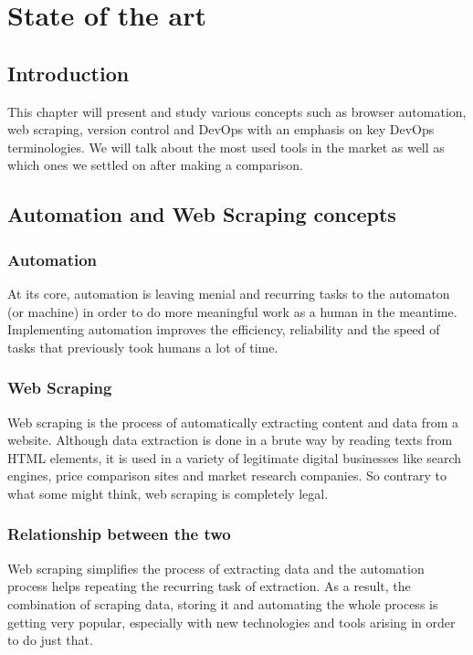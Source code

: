 \chapter{State of the art}
\minitoc
\newpage

\setcounter{secnumdepth}{0} %
\section{Introduction}
This chapter will present and study various concepts such as browser automation, web scraping, version control and DevOps with an emphasis on key DevOps terminologies.
We will talk about the most used tools in the market as well as which ones we settled on after making a comparison.

\setcounter{secnumdepth}{2} %
\section{Automation and Web Scraping concepts}
\subsection{Automation}
At its core, automation is leaving menial and recurring tasks to the automaton (or machine) in order to do more meaningful work as a human in the meantime.
Implementing automation improves the efficiency, reliability and the speed of tasks that previously took humans a lot of time.

\subsection{Web Scraping}
Web scraping is the process of automatically extracting content and data from a website.
Although data extraction is done in a brute way by reading texts from HTML elements, it is used in a variety of legitimate digital businesses like search engines, price comparison sites and market research companies.
So contrary to what some might think, web scraping is completely legal.

\subsection{Relationship between the two}
Web scraping simplifies the process of extracting data and the automation process helps repeating the recurring task of extraction.
As a result, the combination of scraping data, storing it and automating the whole process is getting very popular, especially with new technologies and tools arising in order to do just that.

